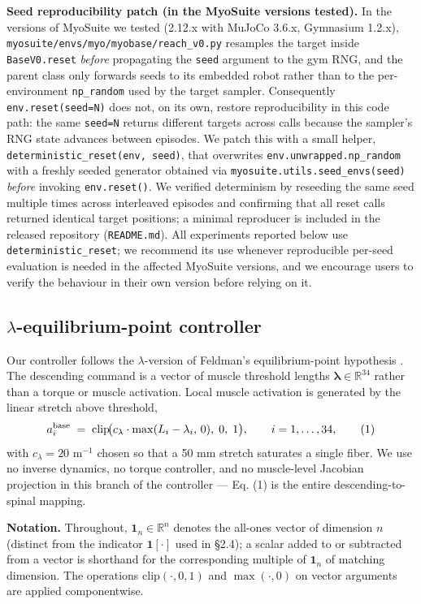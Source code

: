 \documentclass[sn-basic]{sn-jnl}
\begin{document}
\textbf{Seed reproducibility patch (in the MyoSuite versions tested).}
In the versions of MyoSuite we tested (2.12.x with MuJoCo 3.6.x,
Gymnasium 1.2.x), \texttt{myosuite/envs/myo/myobase/reach\_v0.py}
resamples the target inside \texttt{BaseV0.reset} \emph{before}
propagating the \texttt{seed} argument to the gym RNG, and the parent
class only forwards seeds to its embedded robot rather than to the
per-environment \texttt{np\_random} used by the target sampler.
Consequently \texttt{env.reset(seed=N)} does not, on its own, restore
reproducibility in this code path: the same \texttt{seed=N} returns
different targets across calls because the sampler's RNG state advances
between episodes. We patch this with a small helper,
\texttt{deterministic\_reset(env,\ seed)}, that overwrites
\texttt{env.unwrapped.np\_random} with a freshly seeded generator
obtained via \texttt{myosuite.utils.seed\_envs(seed)} \emph{before}
invoking \texttt{env.reset()}. We verified determinism by reseeding the
same seed multiple times across interleaved episodes and confirming that
all reset calls returned identical target positions; a minimal
reproducer is included in the released repository (\texttt{README.md}).
All experiments reported below use \texttt{deterministic\_reset}; we
recommend its use whenever reproducible per-seed evaluation is needed in
the affected MyoSuite versions, and we encourage users to verify the
behaviour in their own version before relying on it.

\subsection{$\lambda$-equilibrium-point
controller}

Our controller follows the $\lambda$-version of Feldman's equilibrium-point
hypothesis \citep{feldman1986, feldmanlevin1995}. The descending
command is a vector of muscle threshold lengths
\(\boldsymbol{\lambda} \in \mathbb{R}^{34}\) rather than a torque or
muscle activation. Local muscle activation is generated by the linear
stretch above threshold, \[
a^{\rm base}_i \;=\; \mathrm{clip}\!\bigl(c_{\lambda}\cdot\max(L_i - \lambda_i,\,0),\;0,\;1\bigr),
\qquad i = 1,\dots,34, \tag{1}
\] with \(c_{\lambda} = 20\) m\(^{-1}\) chosen so that a 50 mm stretch
saturates a single fiber. We use no inverse dynamics, no torque
controller, and no muscle-level Jacobian projection in this branch of
the controller --- Eq. (1) is the entire descending-to-spinal mapping.

\textbf{Notation.} Throughout, \(\mathbf{1}_{n} \in \mathbb{R}^{n}\)
denotes the all-ones vector of dimension \(n\) (distinct from the
indicator \(\mathbf{1}[\cdot]\) used in §2.4); a scalar added to or
subtracted from a vector is shorthand for the corresponding multiple of
\(\mathbf{1}_{n}\) of matching dimension. The operations
\(\mathrm{clip}(\cdot, 0, 1)\) and \(\max(\cdot, 0)\) on vector
arguments are applied componentwise.
\end{document}
